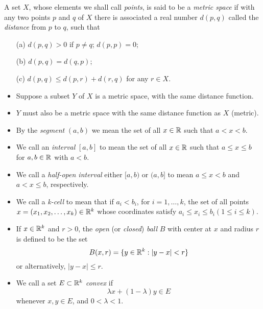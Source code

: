 \documentclass[11pt,a4paper]{book}
\begin{document}
\begin{definition}
   A set \( X  \), whose elements we shall call \textit{points}, is said to be a \textit{metric space} if with any two points \( p  \) and \( q  \) of \( X  \) there is associated a real number \( d(p,q) \) called the \textit{distance} from \( p  \) to \( q  \), such that 
   \begin{enumerate}
       \item[(a)] \( d(p,q) > 0  \) if \( p \neq q  \); \( d(p,p) = 0  \);
        \item[(b)] \( d(p,q) = d(q,p) \);
        \item[(c)] \( d(p,q) \leq d(p,r) + d(r,q) \) for any \( r \in X  \).
   \end{enumerate}
\end{definition}

\begin{itemize}
    \item Suppose a subset \( Y  \) of \( X  \) is a metric space, with the same distance function.
    \item \( Y  \) must also be a metric space with the same distance function as \( X  \) (metric).
\end{itemize}

\begin{definition}[ ]
    \begin{itemize}
        \item By the \textit{segment} \( (a,b) \) we mean the set of all \( x \in \mathbb{R}  \) such that \( a < x < b \).
        \item We call an \textit{interval} \( [a,b] \) to mean the set of all \( x \in \mathbb{R}  \) such that \( a \leq x \leq b  \) for \( a,b \in \mathbb{R}  \) with \( a < b  \).
        \item We call a \textit{half-open interval} either \( [a,b) \) or \( (a,b] \) to mean \( a \leq x <  b  \) and \( a < x \leq b  \), respectively.
        \item We call a \textit{k-cell} to mean that if \( {a}_{i} < {b}_{i} \), for \( i = 1, \dots, k  \), the set of all points \( x = ({x}_{1}, {x}_{2}, \dots, {x}_{k }) \in \mathbb{R}^{k } \) whose coordinates satisfy \( {a}_{i} \leq {x}_{i} \leq {b}_{i} (1 \leq i \leq k ) \).  
        \item If \( x \in \mathbb{R}^{k}  \) and \( r > 0  \), the \textit{open} (or \textit{closed}) \textit{ball} \( B \) with center at \( x  \) and radius \( r  \) is defined to be the set
            \[ B(x,r) = \{ y \in \mathbb{R}^{k}: | y - x  | < r  \}  \]
            or alternatively, \( | y - x  | \leq  r  \).
        \item We call a set \( E \subset \mathbb{R}^{k} \) \textit{convex} if
            \[  \lambda x + (1 - \lambda) y \in E  \]
            whenever \( x,y \in E  \), and \(  0 < \lambda < 1  \).
    \end{itemize}
\end{definition}
\end{document}
